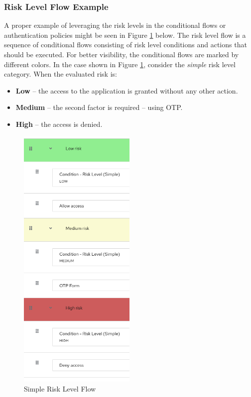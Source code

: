 \subsubsection{Risk Level Flow Example}

A proper example of leveraging the risk levels in the conditional flows or authentication policies might be seen in Figure \ref{fig:risk-levels-example} below.
The risk level flow is a sequence of conditional flows consisting of risk level conditions and actions that should be executed.
For better visibility, the conditional flows are marked by different colors.
\newline
\newline
In the case shown in Figure \ref{fig:risk-levels-example}, consider the \textit{simple} risk level category. When the evaluated risk is:
\begin{itemize}
    \item \textbf{Low} -- the access to the application is granted without any other action.
    \item \textbf{Medium} -- the second factor is required -- using OTP.
    \item \textbf{High} -- the access is denied.
\end{itemize}

\begin{figure}[htbp]
  \centering
  \includegraphics[width=0.5\textwidth]{img/sections/5-design/simple-risk-level-flow.png}
  \caption{Simple Risk Level Flow}
  \label{fig:risk-levels-example}
\end{figure}


